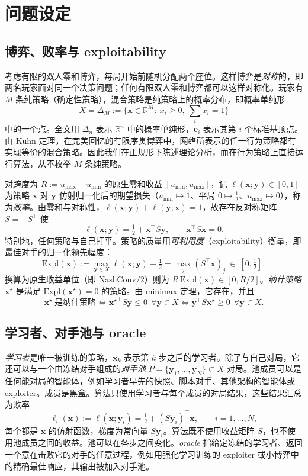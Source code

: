 \documentclass{article}
\theoremstyle{plain}
\theoremstyle{remark}
\newcommand{\Expl}{\mathrm{Expl}}
\newcommand{\simplex}{\Delta}
\newcommand{\bx}{{\bm{x}}}
\newcommand{\by}{{\bm{y}}}
\newcommand{\be}{{\bm{e}}}
\newcommand{\xs}{\bx^{\star}}
\begin{document}
\section{问题设定}
\label{sec:prelim}

\subsection{博弈、败率与 exploitability}

考虑有限的双人零和博弈，每局开始前随机分配两个座位。这样博弈是\emph{对称}的，即两名玩家面对同一个决策问题；任何有限双人零和博弈都可以这样对称化。玩家有 $M$ 条纯策略（确定性策略），混合策略是纯策略上的概率分布，即概率单纯形
\[
X=\simplex_M:=\Big\{\bx\in\mathbb R^M:\ x_i\ge0,\ \textstyle\sum_ix_i=1\Big\}
\]
中的一个点。全文用 $\simplex_n$ 表示 $\mathbb R^n$ 中的概率单纯形，$\be_i$ 表示其第 $i$ 个标准基顶点。由 Kuhn 定理\citep{kuhn1953}，在完美回忆的有限序贯博弈中，网络所表示的任一行为策略都有实现等价的混合策略。因此我们在正规形下陈述理论分析，而在行为策略上直接运行算法，从不枚举 $M$ 条纯策略。

对跨度为 $R:=u_{\max}-u_{\min}$ 的原生零和收益 $[u_{\min},u_{\max}]$，记 $\ell(\bx;\by)\in[0,1]$ 为策略 $\bx$ 对 $\by$ 仿射归一化后的期望损失（$u_{\min}\mapsto1$、平局 $0\mapsto\tfrac12$、$u_{\max}\mapsto0$），称为\emph{败率}。由零和与对称性，$\ell(\bx;\by)+\ell(\by;\bx)=1$，故存在反对称矩阵 $S=-S^\top$ 使
\[
\ell(\bx;\by)=\tfrac12+\bx^\top S\by,\qquad \bx^\top S\bx=0 .
\]
特别地，任何策略与自己打平。策略的质量用\emph{可利用度}（exploitability）衡量，即最佳对手的归一化领先幅度：
\[
\Expl(\bx):=\max_{\by\in X}\ell(\bx;\by)-\tfrac12=\max_j(S^\top \bx)_j\ \in\ [0,\tfrac12] ,
\]
换算为原生收益单位（即 $\mathrm{NashConv}/2$）则为 $R\,\Expl(\bx)\in[0,R/2]$。\emph{纳什策略} $\xs$ 是满足 $\Expl(\xs)=0$ 的策略。由 minimax 定理，它存在\citep{vonneumann1928}，并且
\begin{equation}
\xs\ \text{是纳什策略}\iff {\xs}^\top S\by\le0\ \ \forall \by\in X\iff \by^\top S\xs\ge0\ \ \forall \by\in X .
\label{eq:nash}
\end{equation}

\subsection{学习者、对手池与 oracle}
\label{sec:setting}

\emph{学习者}是唯一被训练的策略，$\bx_k$ 表示第 $k$ 步之后的学习者。除了与自己对局，它还可以与一个由冻结对手组成的\emph{对手池} $P=\{\by_1,\dots,\by_N\}\subset X$ 对局。池成员可以是任何能对局的智能体，例如学习者早先的快照、脚本对手、其他架构的智能体或 exploiter。成员是黑盒。算法只使用学习者与每个成员的对局结果，这些结果汇总为败率
\[
\ell_i(\bx):=\ell(\bx;\by_i)=\tfrac12+(S\by_i)^\top\bx ,\qquad i=1,\dots,N,
\]
每个都是 $\bx$ 的仿射函数，梯度为常向量 $S\by_i$。算法既不使用收益矩阵 $S$，也不使用池成员之间的收益。池可以在各步之间变化。\emph{oracle} 指给定冻结的学习者、返回一个意在击败它的对手的任意过程，例如用强化学习训练的 exploiter 或小博弈中的精确最佳响应，其输出被加入对手池。
\end{document}

